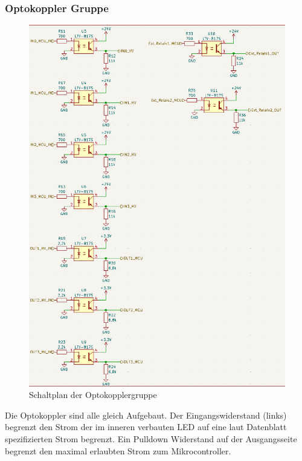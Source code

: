 \subsubsection{Optokoppler Gruppe}
\begin{figure}[H]
	\centering
	\includegraphics[width=1.0\textwidth]{images/Hardware/Optokoppler_Schaltplan.PNG}
	\caption{Schaltplan der Optokopplergruppe}
	\label{fig:Optokoppler_gruppe}
\end{figure}
Die Optokoppler sind alle gleich Aufgebaut. Der Eingangswiderstand (links) begrenzt den Strom der im inneren verbauten LED auf eine laut Datenblatt spezifizierten Strom begrenzt. Ein Pulldown Widerstand auf der Ausgangsseite begrenzt den maximal erlaubten Strom zum Mikrocontroller.

